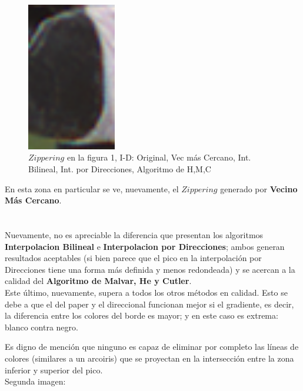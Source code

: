 \documentclass[a4paper]{article}
\begin{document}
\begin{figure}[h!]
\includegraphics[width=110pt]{img/img1-3-recortada.png}
\caption{$Zippering$ en la figura 1, I-D: Original, Vec más Cercano, Int. Bilineal, Int. por Direcciones, Algoritmo de H,M,C}
\end{figure}

En esta zona en particular se ve, nuevamente, el $Zippering$ generado por \textbf{Vecino Más Cercano}.\\ \\ \\
Nuevamente, no es apreciable la diferencia que presentan los algoritmos \textbf{Interpolacion Bilineal} e \textbf{Interpolacion por Direcciones}; ambos generan resultados aceptables (si bien parece que el pico en la interpolación por Direcciones tiene una forma más definida y menos redondeada) y se acercan a la calidad del \textbf{Algoritmo de Malvar, He y Cutler}.\\
Este último, nuevamente, supera a todos los otros métodos en calidad. Esto se debe a que el del paper y el direccional funcionan mejor si el gradiente, es decir, la diferencia entre los colores del borde es mayor; y en este caso es extrema: blanco contra negro.

Es digno de mención que ninguno es capaz de eliminar por completo las líneas de colores (similares a un arcoiris) que se proyectan en la intersección entre la zona inferior y superior del pico.\\

Segunda imagen:
\end{document}
